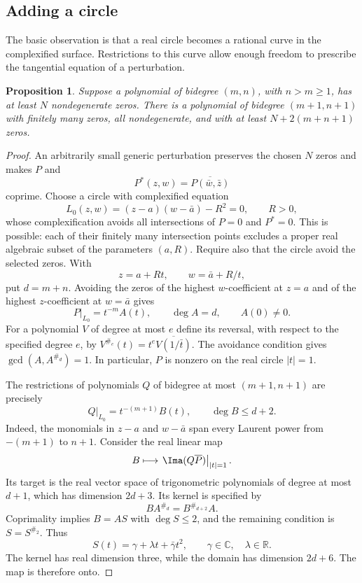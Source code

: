\documentclass[UTF8,11pt]{ctexart}
\newtheorem{prop}[thm]{Proposition}
\theoremstyle{definition}
\numberwithin{equation}{section}
\newcommand{\C}{\mathbb C}\newcommand{\R}{\mathbb R}
\begin{document}
\subsection{Adding a circle}
The basic observation is that a real circle becomes a rational curve
in the complexified surface. Restrictions to this curve allow enough
freedom to prescribe the tangential equation of a perturbation.
\begin{prop}\label{b:prop:circleaddition}
Suppose a polynomial of bidegree $(m,n)$, with $n>m\ge1$, has at
least $N$ nondegenerate zeros. There is a polynomial of bidegree
$(m+1,n+1)$ with finitely many zeros, all nondegenerate, and with
at least $N+2(m+n+1)$ zeros.
\end{prop}
\begin{proof}
An arbitrarily small generic perturbation preserves the chosen $N$
zeros and makes $P$ and
\[
 P^*(z,w)=\overline{P(\bar w,\bar z)}
\]
coprime. Choose a circle with complexified equation
\[
 L_0(z,w)=(z-a)(w-\bar a)-R^2=0,\qquad R>0,
\]
whose complexification avoids all intersections of $P=0$ and $P^*=0$.
This is possible: each of their finitely many intersection points
excludes a proper real algebraic subset of the parameters $(a,R)$.
Require also that the circle avoid the selected zeros. With
\[
 z=a+Rt,\qquad w=\bar a+R/t,
\]
put $d=m+n$. Avoiding the zeros of the highest $w$-coefficient at $z=a$ and
of the highest $z$-coefficient at $w=\bar a$ gives
\[
 P|_{L_0}=t^{-m}A(t),\qquad \deg A=d,\qquad A(0)\ne0.
\]
For a polynomial $V$ of degree at most $e$ define its reversal, with
respect to the specified degree $e$, by
$V^{\#_e}(t)=t^e\overline{V(1/\bar t)}$.
The avoidance condition gives $\gcd(A,A^{\#_d})=1$.
In particular, $P$ is nonzero on the real circle $|t|=1$.

The restrictions of polynomials $Q$ of bidegree at most
$(m+1,n+1)$ are precisely
\[
 Q|_{L_0}=t^{-(m+1)}B(t),\qquad \deg B\le d+2.
\]
Indeed, the monomials in $z-a$ and $w-\bar a$ span every Laurent
power from $-(m+1)$ to $n+1$.
Consider the real linear map
\[
 B\longmapsto \left.\Ima(Q\overline P)\right|_{|t|=1}.
\]
Its target is the real vector space of trigonometric polynomials of
degree at most $d+1$, which has dimension $2d+3$. Its kernel is
specified by
\[
 BA^{\#_d}=B^{\#_{d+2}}A.
\]
Coprimality implies $B=AS$ with $\deg S\le2$, and the remaining
condition is $S=S^{\#_2}$. Thus
\[
 S(t)=\gamma+\lambda t+\bar\gamma t^2,
 \qquad \gamma\in\C,\quad\lambda\in\R.
\]
The kernel has real dimension three, while the domain has dimension
$2d+6$. The map is therefore onto.


\end{proof}
\end{document}
